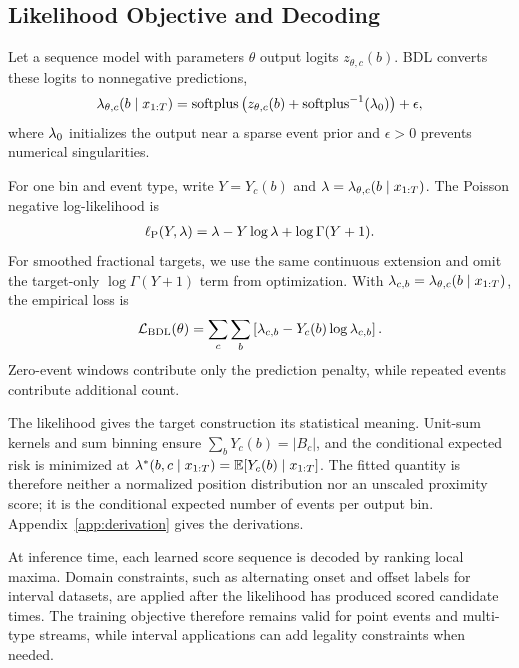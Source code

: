 \subsection{Likelihood Objective and Decoding}
\label{subsec:poisson}

Let a sequence model with parameters $\theta$ output logits $z_{\theta,c}(b)$.
BDL converts these logits to nonnegative predictions,
\begin{align}
    \lambda_{\theta,c}(b\mid x_{1:T})
    =
    \operatorname{softplus}\left(z_{\theta,c}(b) + \operatorname{softplus}^{-1}(\lambda_0)\right)
    + \epsilon,
    \label{eq:rate-param}
\end{align}
where $\lambda_0$ initializes the output near a sparse event prior and $\epsilon>0$ prevents numerical singularities.

For one bin and event type, write $Y=Y_c(b)$ and $\lambda=\lambda_{\theta,c}(b\mid x_{1:T})$.
The Poisson negative log-likelihood is
\begin{align}
    \ell_{\mathrm{P}}(Y,\lambda)
    =
    \lambda - Y\log \lambda + \log \Gamma(Y+1).
\end{align}
For smoothed fractional targets, we use the same continuous extension and omit the target-only $\log\Gamma(Y+1)$ term from optimization.
With $\lambda_{c,b}=\lambda_{\theta,c}(b\mid x_{1:T})$, the empirical loss is
\begin{align}
    \mathcal{L}_{\mathrm{BDL}}(\theta)
    =
    \sum_c\sum_b
    \left[
        \lambda_{c,b}
        -
        Y_c(b)\log \lambda_{c,b}
    \right].
    \label{eq:bdl-loss}
\end{align}
Zero-event windows contribute only the prediction penalty, while repeated events contribute additional count.

The likelihood gives the target construction its statistical meaning.
Unit-sum kernels and sum binning ensure $\sum_b Y_c(b)=|B_c|$, and the conditional expected risk is minimized at $\lambda^*(b,c\mid x_{1:T})=\mathbb{E}[Y_c(b)\mid x_{1:T}]$.
The fitted quantity is therefore neither a normalized position distribution nor an unscaled proximity score; it is the conditional expected number of events per output bin.
Appendix~\ref{app:derivation} gives the derivations.

At inference time, each learned score sequence is decoded by ranking local maxima.
Domain constraints, such as alternating onset and offset labels for interval datasets, are applied after the likelihood has produced scored candidate times.
The training objective therefore remains valid for point events and multi-type streams, while interval applications can add legality constraints when needed.
